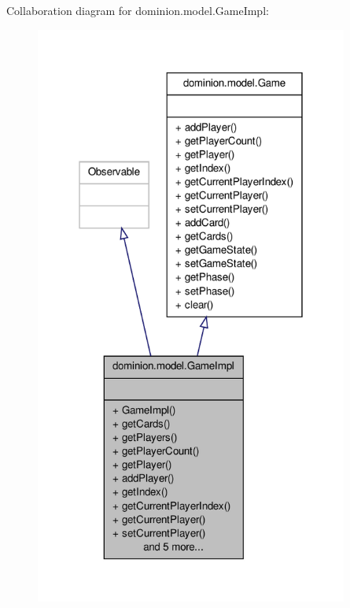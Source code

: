 \-Collaboration diagram for dominion.\-model.\-Game\-Impl\-:
\nopagebreak
\begin{figure}[H]
\begin{center}
\leavevmode
\includegraphics[width=292pt]{classdominion_1_1model_1_1GameImpl__coll__graph}
\end{center}
\end{figure}
